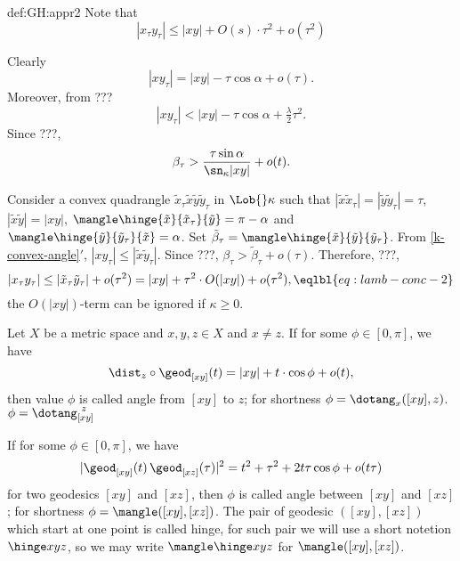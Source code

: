{\begin{subthm}{def:GH:appr2}
Note that 
$$|x_\tau y_\tau|\le |xy|+O(s)\cdot \tau^2+o(\tau^2)$$

Clearly 
$$|xy_\tau|=|xy|-\tau\cos\alpha+o(\tau).$$ 
Moreover, from  ???
$$|xy_\tau|<|xy|-\tau\cos\alpha+\tfrac\lambda2 \tau^2.$$
Since ???, 
$$\beta_\tau>\frac{\tau\sin\alpha}{\sn_\kappa|xy|}+o(t).$$


Consider a convex quadrangle $\tilde x_\tau\tilde x\tilde y\tilde y_\tau$ in $\Lob{}\kappa$
such that $|\tilde x\tilde x_\tau|=|\tilde y\tilde y_\tau|=\tau$, $|\tilde x\tilde y|=|xy|$, $\mangle\hinge {\tilde x}{\tilde x_\tau}{\tilde y}=\pi-\alpha$ and $\mangle\hinge {\tilde y}{\tilde y_\tau}{\tilde x}=\alpha$.
Set $\tilde \beta_\tau=\mangle\hinge {\tilde x} {\tilde y} {\tilde y_\tau}$.
From \ref{k-convex-angle}$'\!$, $|xy_\tau|\le|\tilde x\tilde y_\tau|$.
Since ???, $\beta_\tau>\tilde \beta_\tau+o(\tau)$. 
Therefore, ???,
$$|x_\tau y_\tau|
\le
|\tilde x_\tau\tilde y_\tau|+o(\tau^2)
=|xy|+\tau^2\cdot O(|xy|)+o(\tau^2),
\eqlbl{eq:lamb-conc-2}$$
the $O(|xy|)$-term can be ignored if $\kappa\ge 0$.























Let $X$ be a metric space and $x,y,z\in X$ and
$x\not=z$.
If for some $\phi\in[0,\pi]$, we have 
$$\dist_z\circ\geod_{[x y]}(t)=|xy|+t\cdot\cos\phi+o(t),$$
then value $\phi$ is called angle from $[x y]$ to $z$;
for shortness $\phi=\dotang_x([x y],z)$. $\phi=\dotang_{[x y]}^{\ z}$

If for some $\phi\in[0,\pi]$, we have
$$|\geod_{[x y]}(t)\,\geod_{[x z]}(\tau)|^2=t^2+\tau^2+2t\tau\cos\phi+o(t\tau)$$
for two geodesics $[x y]$ and $[x z]$,
then $\phi$ is called angle between $[x y]$ and $[x z]$;
for shortness $\phi=\mangle([xy],[xz])$.
The pair of geodesic $([xy],[xz])$ which start at one point is called hinge,
for such pair we will use a short notetion $\hinge x y z$, so we may write $\mangle\hinge x y z$ for $\mangle([xy],[xz])$.
















\end{subthm}}
